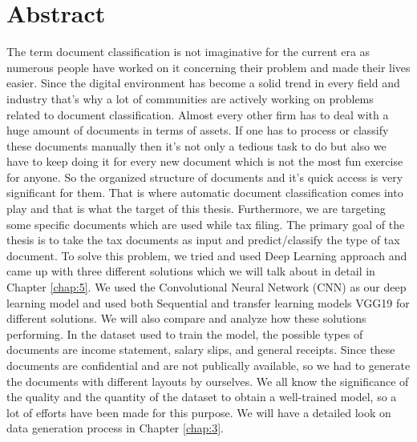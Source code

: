 \chapter*{Abstract}
The term document classification is not imaginative for the current era as numerous people have worked on it concerning their problem and made their lives easier. Since the digital environment has become a solid trend in every field and industry that's why a lot of communities are actively working on problems related to document classification. Almost every other firm has to deal with a huge amount of documents in terms of assets. If one has to process or classify these documents manually then it's not only a tedious task to do but also we have to keep doing it for every new document which is not the most fun exercise for anyone. So the organized structure of documents and it's quick access is very significant for them. That is where automatic document classification comes into play and that is what the target of this thesis.
\newline
\newline
Furthermore, we are targeting some specific documents which are used while tax filing. The primary goal of the thesis is to take the tax documents as input and predict/classify the type of tax document. To solve this problem, we tried and used Deep Learning approach and came up with three different solutions which we will talk about in detail in Chapter \ref{chap:5}. We used the Convolutional Neural Network (CNN) as our deep learning model and used both Sequential and transfer learning models VGG19 \cite{vgg_19} for different solutions. We will also compare and analyze how these solutions performing. In the dataset used to train the model, the possible types of documents are income statement, salary slips, and general receipts. Since these documents are confidential and are not publically available, so we had to generate the documents with different layouts by ourselves. We all know the significance of the quality and the quantity of the dataset to obtain a well-trained model, so a lot of efforts have been made for this purpose. We will have a detailed look on data generation process in Chapter \ref{chap:3}.



